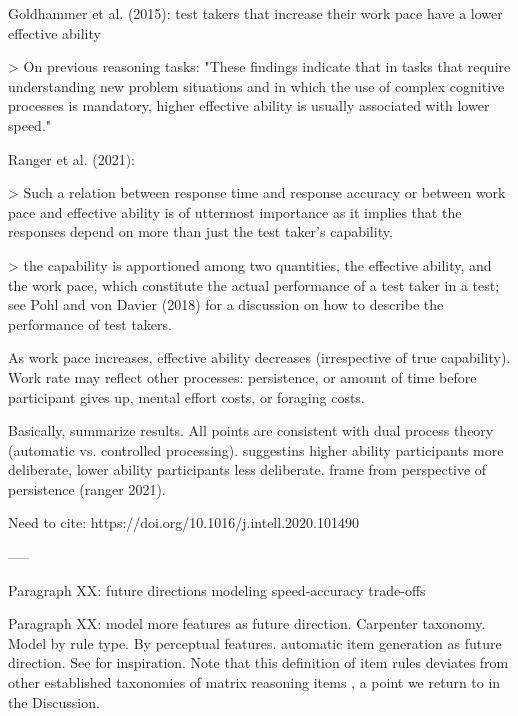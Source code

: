 \documentclass[a4paper,man,natbib]{apa6}
\begin{document}
Goldhammer et al. (2015): test takers that increase their work pace have a lower effective ability

> On previous reasoning tasks: "These findings indicate that in tasks that require understanding new problem situations and in which the use of complex cognitive processes is mandatory, higher effective ability is usually associated with lower speed." 

Ranger et al. (2021): 

> Such a relation between response time and response accuracy or between work pace and effective ability is of uttermost importance as it implies that the responses depend on more than just the test taker’s capability.

> the capability is apportioned among two quantities, the effective ability, and the work pace, which constitute the actual performance of a test taker in a test; see Pohl and von Davier (2018) for a discussion on how to describe the performance of test takers. 

As work pace increases, effective ability decreases (irrespective of true capability). Work rate may reflect other processes: persistence, or amount of time before participant gives up, mental effort costs, or foraging costs.  

Basically, summarize results. All points are consistent with dual process theory (automatic vs. controlled processing). suggestins higher ability participants more deliberate, lower ability participants less deliberate. frame from perspective of persistence (ranger 2021).

Need to cite: https://doi.org/10.1016/j.intell.2020.101490

-----

Paragraph XX: future directions modeling speed-accuracy trade-offs

Paragraph XX: model more features as future direction. Carpenter taxonomy. Model by rule type. By perceptual features. automatic item generation as future direction. See \cite{lathrop2017item} for inspiration. Note that this definition of item rules deviates from other established taxonomies of matrix reasoning items \citep{carpenter1990one}, a point we return to in the Discussion.


\end{document}
